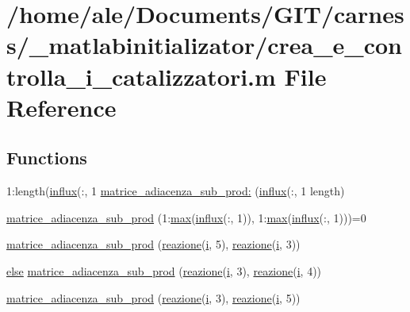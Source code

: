 \hypertarget{a00056}{\section{/home/ale/\-Documents/\-G\-I\-T/carness/\-\_\-matlabinitializator/crea\-\_\-e\-\_\-controlla\-\_\-i\-\_\-catalizzatori.m File Reference}
\label{a00056}
}
\subsection*{Functions}
\begin{DoxyCompactItemize}
\item 
1\-:length(\hyperlink{a00059_a902e747aeec6b345d3a057099152f41f}{influx}(\-:, 1 \hyperlink{a00056_a195fa22a2398c6f353792d39be88e00d}{matrice\-\_\-adiacenza\-\_\-sub\-\_\-prod\-:} (\hyperlink{a00059_a902e747aeec6b345d3a057099152f41f}{influx}(\-:, 1 length)
\item 
\hyperlink{a00056_ae7da9fe2a41436b8435a4d7e5066d310}{matrice\-\_\-adiacenza\-\_\-sub\-\_\-prod} (1\-:\hyperlink{a00056_a6d9c24e62aee61f54530163edf684ae2}{max}(\hyperlink{a00059_a902e747aeec6b345d3a057099152f41f}{influx}(\-:, 1)), 1\-:\hyperlink{a00056_a6d9c24e62aee61f54530163edf684ae2}{max}(\hyperlink{a00059_a902e747aeec6b345d3a057099152f41f}{influx}(\-:, 1)))=0
\item 
\hyperlink{a00056_aae3caf6a86a43bdf9fe5a6588adce1b2}{matrice\-\_\-adiacenza\-\_\-sub\-\_\-prod} (\hyperlink{a00062_a65cf6e12ba9a8c10222f3f1f71f7c95f}{reazione}(\hyperlink{a00065_ad3efca1ea6e3333daf30719ee0501862}{i}, 5), \hyperlink{a00062_a65cf6e12ba9a8c10222f3f1f71f7c95f}{reazione}(\hyperlink{a00065_ad3efca1ea6e3333daf30719ee0501862}{i}, 3))
\item 
\hyperlink{a00025_af5946383720aa572eb93e1e63afc23c2}{else} \hyperlink{a00056_a5ea236a7441a51f71adef1c414145d3b}{matrice\-\_\-adiacenza\-\_\-sub\-\_\-prod} (\hyperlink{a00062_a65cf6e12ba9a8c10222f3f1f71f7c95f}{reazione}(\hyperlink{a00065_ad3efca1ea6e3333daf30719ee0501862}{i}, 3), \hyperlink{a00062_a65cf6e12ba9a8c10222f3f1f71f7c95f}{reazione}(\hyperlink{a00065_ad3efca1ea6e3333daf30719ee0501862}{i}, 4))
\item 
\hyperlink{a00056_a3568a7566d3871de5460f8fe96044c26}{matrice\-\_\-adiacenza\-\_\-sub\-\_\-prod} (\hyperlink{a00062_a65cf6e12ba9a8c10222f3f1f71f7c95f}{reazione}(\hyperlink{a00065_ad3efca1ea6e3333daf30719ee0501862}{i}, 3), \hyperlink{a00062_a65cf6e12ba9a8c10222f3f1f71f7c95f}{reazione}(\hyperlink{a00065_ad3efca1ea6e3333daf30719ee0501862}{i}, 5))

\end{DoxyCompactItemize}
